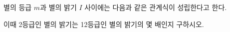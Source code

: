 별의 등급 $m$과 별의 밝기 $I$ 사이에는 다음과 같은 관계식이 성립한다고 한다.\par\smallskip{}\par\smallskip\noindent 이때 2등급인 별의 밝기는 12등급인 별의 밝기의 몇 배인지 구하시오.

